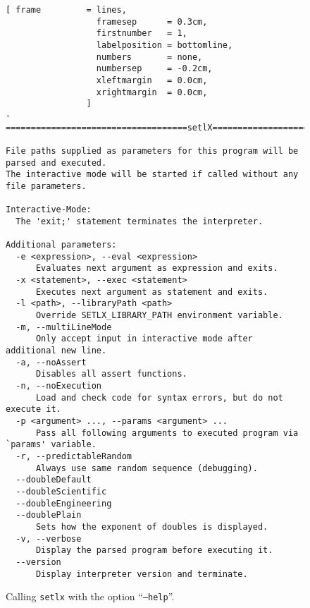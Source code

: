 \begin{figure}[!ht]
\centering
\begin{Verbatim}[ frame         = lines, 
                  framesep      = 0.3cm, 
                  firstnumber   = 1,
                  labelposition = bottomline,
                  numbers       = none,
                  numbersep     = -0.2cm,
                  xleftmargin   = 0.0cm,
                  xrightmargin  = 0.0cm,
                ]
-====================================setlX=============================v2.2.0=-

File paths supplied as parameters for this program will be parsed and executed.
The interactive mode will be started if called without any file parameters.

Interactive-Mode:
  The 'exit;' statement terminates the interpreter.

Additional parameters:
  -e <expression>, --eval <expression>
      Evaluates next argument as expression and exits.
  -x <statement>, --exec <statement>
      Executes next argument as statement and exits.
  -l <path>, --libraryPath <path>
      Override SETLX_LIBRARY_PATH environment variable.
  -m, --multiLineMode
      Only accept input in interactive mode after additional new line.
  -a, --noAssert
      Disables all assert functions.
  -n, --noExecution
      Load and check code for syntax errors, but do not execute it.
  -p <argument> ..., --params <argument> ...
      Pass all following arguments to executed program via `params' variable.
  -r, --predictableRandom
      Always use same random sequence (debugging).
  --doubleDefault
  --doubleScientific
  --doubleEngineering
  --doublePlain
      Sets how the exponent of doubles is displayed.
  -v, --verbose
      Display the parsed program before executing it.
  --version
      Display interpreter version and terminate.
\end{Verbatim}
\vspace*{-0.3cm}
\caption{Calling \texttt{setlx} with the option ``\texttt{--help}''.}
\label{fig:help-option}
\end{figure}


